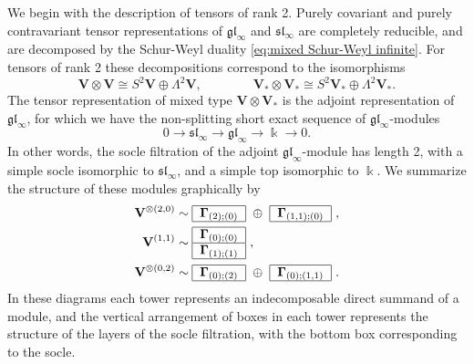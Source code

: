 \documentclass[12pt,reqno]{amsart}
\numberwithin{equation}{section}
\theoremstyle{plain}
\theoremstyle{definition}
\def\gl{\mathfrak{gl}}
\def\sl{\mathfrak{sl}}
\def\o{\otimes}
\def\glV_#1{\boldsymbol\Gamma_{#1}}
\def\VV{\mathbf V}
\begin{document}
 We begin with the description of tensors of rank 2.
Purely covariant and purely contravariant tensor representations of $\gl_\infty$ and $\sl_\infty$ are
completely reducible, and are decomposed by
the Schur-Weyl duality \eqref{eq:mixed Schur-Weyl
infinite}. For tensors of rank 2 these decompositions correspond to the
isomorphisms
\begin{equation*}
    \VV \o \VV \cong S^2 \VV \oplus \Lambda^2 \VV,
    \qquad\qquad
    \VV_* \o \VV_* \cong S^2 \VV_* \oplus \Lambda^2 \VV_*.
\end{equation*}
The tensor representation of mixed type $\VV \o \VV_*$ is the
adjoint representation of $\gl_\infty$, for which we have the
non-splitting short exact sequence of $\gl_\infty$-modules
\begin{equation*}
    0 \to \sl_\infty \to \gl_\infty \to \Bbbk \to 0.
\end{equation*}
In other words, the socle filtration of the adjoint
$\gl_\infty$-module has length 2, with a simple socle isomorphic to
$\sl_\infty$, and a simple top isomorphic to $\Bbbk$. We summarize
the structure of these modules graphically by
\begin{align*}
    \VV^{\o(2,0)}  &\sim
    \begin{tabular}{|c|}
        \hline
        $\glV_{(2);(0)}$\\
        \hline
    \end{tabular}
    \ \oplus \
    \begin{tabular}{|c|}
        \hline
        $\glV_{(1,1);(0)}$\\
        \hline
    \end{tabular}\ ,
    \\
    \VV^{(1,1)}  &\sim
    \begin{tabular}{|c|}
        \hline
        $\glV_{(0);(0)}$\\
        \hline
        $\glV_{(1);(1)}$\\
        \hline
    \end{tabular}\ ,
    \\
    \VV^{\o(0,2)}&\sim
    \begin{tabular}{|c|}
        \hline
        $\glV_{(0);(2)}$\\
        \hline
    \end{tabular}
    \ \oplus \
    \begin{tabular}{|c|}
        \hline
        $\glV_{(0);(1,1)}$\\
        \hline
    \end{tabular}\ .
\end{align*}
In these diagrams each tower represents an indecomposable direct summand of a module, and
the vertical arrangement of boxes in each tower represents the
structure of the layers of the socle filtration, with the bottom box
corresponding to the socle.
\end{document}
